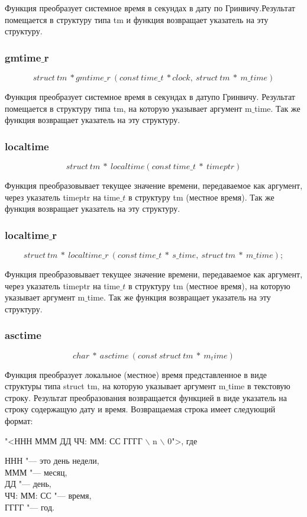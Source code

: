 \documentclass{article}
\begin{document}
				Функция преобразует системное время в секундах в дату по Гринвичу.Результат помещается в структуру типа tm и 					функция возвращает указатель на эту структуру.
			\subsubsection*{gmtime$\_$r}
			$$struct~tm~*gmtime\_r~(const~time\_t~*clock,~struct~tm~*~m\_time)$$			
			
				Функция преобразует системное время в секундах в датупо Гринвичу. Результат помещается в структуру типа tm, на 					которую указывает аргумент m$\_$time. Так же функция возвращает указатель на эту структуру. 			
			\subsubsection*{localtime}
			$$struct~tm~*~localtime(const~time\_t~*~timeptr)$$
			
				Функция преобразовывает текущее значение времени, передаваемое как аргумент, через указатель timeptr на time$\_t$ 			в структуру tm (местное время). Так же функция возвращает указатель на эту структуру.
			\subsubsection*{localtime$\_$r}
			$$struct~tm~*~localtime\_r~(const~time\_t~*~s\_time,~struct~tm~*~m\_time);$$
			
				Функция преобразовывает текущее значение времени, передаваемое как аргумент, через указатель timeptr на time$\_t$ 			в структуру tm (местное время), на которую указывает аргумент m$\_$time. Так же функция возвращает указатель на эту 				структуру.			
			\subsubsection*{asctime}
			$$char~*~asctime~(const~struct~tm~*~m_time)$$			
			
				Функция преобразует локальное (местное) время представленное в виде структуры типа struct tm, на которую 						указывает аргумент m$\_$time в текстовую строку. Результат преобразования возвращается функцией в виде указатель на 				строку содержащую дату и время. 
			Возвращаемая строка имеет следующий формат:
			\begin{center}
				"<ННН МММ ДД ЧЧ: ММ: СС ГГГГ $\backslash$ n $\backslash$ 0">, где\\
			\end{center}
			ННН "--- это день недели,\\
			МММ "--- месяц,\\
			ДД "--- день,\\
			ЧЧ: ММ: СС "--- время,\\
			ГГГГ "--- год.
\end{document}
